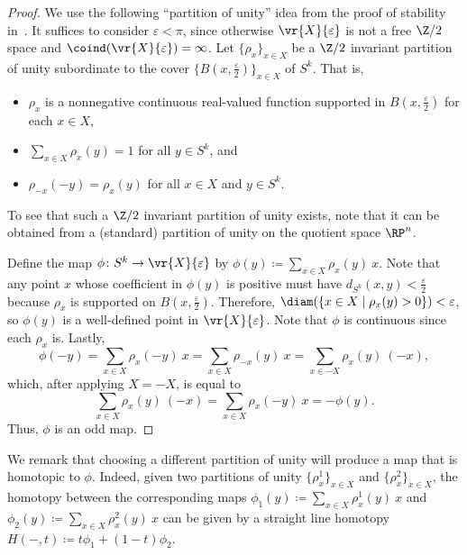\documentclass[11pt, reqno, english]{amsart}
\begin{document}
\begin{proof}
We use the following ``partition of unity'' idea from the proof of stability in~\cite{AMMW,MoyMasters}.
It suffices to consider $\varepsilon < \pi$, since otherwise $\vr{X}{\varepsilon}$ is not a free $\Z/2$ space and $\coind(\vr{X}{\varepsilon})=\infty$.
Let $\{\rho_x\}_{x\in X}$ be a $\Z/2$ invariant partition of unity subordinate to the cover $\{B\left(x, \tfrac{\varepsilon}{2}\right)\}_{x\in X}$ of $S^k$.
That is,
\begin{itemize}
\item $\rho_x$ is a nonnegative continuous real-valued function supported in $B\left(x, \tfrac{\varepsilon}{2}\right)$ for each $x\in X$,
\item $\sum_{x\in X} \rho_x(y) = 1$ for all $y\in S^k$, and
\item $\rho_{-x}(-y) = \rho_{x}(y)$ for all $x\in X$ and $y\in S^k$.
\end{itemize}
To see that such a $\Z/2$ invariant partition of unity exists, note that it can be obtained from a (standard) partition of unity on the quotient space $\RP^n$.

Define the map $\phi\colon S^k \to \vr{X}{\varepsilon}$ by
$\phi(y) \coloneqq \sum_{x\in X} \rho_x(y)\ x$.
Note that any point $x$ whose coefficient in $\phi(y)$ is positive must have $d_{S^k}(x, y)< \tfrac{\varepsilon}{2}$ because $\rho_x$ is supported on $B\left(x, \tfrac{\varepsilon}{2}\right)$.
Therefore, $\diam(\{x\in X \mid \rho_x(y)>0\}) < \varepsilon$, so $\phi(y)$ is a well-defined point in $\vr{X}{\varepsilon}$.
Note that $\phi$ is continuous since each $\rho_x$ is.
Lastly,
\[ \phi(-y)
= \sum_{x\in X} \rho_x(-y)\ x
= \sum_{x\in X} \rho_{-x}(y)\ x
= \sum_{x\in -X} \rho_{x}(y)\ (-x),
\]
which, after applying $X=-X$, is equal to \[\sum_{x\in X} \rho_{x}(y)\ (-x)
= \sum_{x\in X} \rho_{x}(-y)\ x
=-\phi(y).\]
Thus, $\phi$ is an odd map.
\end{proof}

We remark that choosing a different partition of unity will produce a map that is homotopic to $\phi$.
Indeed, given two partitions of unity $\{\rho^1_x\}_{x\in X}$ and $\{\rho^2_x\}_{x\in X}$, the homotopy between the corresponding maps $\phi_1(y) \coloneqq \sum_{x\in X} \rho^1_x(y)\ x$ and $\phi_2(y) \coloneqq \sum_{x\in X} \rho^2_x(y)\ x$ can be given by a straight line homotopy $H(-,t) \coloneqq t\phi_1+(1-t)\phi_2$.
\end{document}
